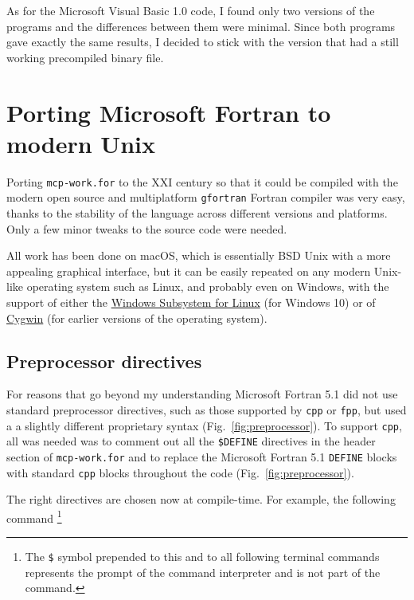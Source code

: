 As for the Microsoft Visual Basic 1.0 code, I found only two versions of the programs and the differences between them were minimal. Since both programs gave exactly the same results, I decided to stick with the version that had a still working precompiled binary file.



\section{Porting Microsoft Fortran to modern Unix}

Porting \texttt{mcp-work.for} to the XXI century so that it could be compiled with the modern open source and multiplatform \texttt{gfortran} Fortran compiler was very easy, thanks to the stability of the language across different versions and platforms. Only a few minor tweaks to the source code were needed.

All work has been done on macOS, which is essentially BSD Unix with a more appealing graphical interface, but it can be easily repeated on any modern Unix-like operating system such as Linux, and probably even on Windows, with the support of either the \href{https://docs.microsoft.com/en-us/windows/wsl/}{Windows Subsystem for Linux} (for Windows 10) or of \href{http://www.cygwin.org/}{Cygwin} (for earlier versions of the operating system).



\subsection{Preprocessor directives}

For reasons that go beyond my understanding Microsoft Fortran 5.1 did not use standard preprocessor directives, such as those supported by \texttt{cpp} or \texttt{fpp}, \cite{Boyanski:1992} but used a a slightly different proprietary syntax (Fig.~\ref{fig:preprocessor}). 
To support \texttt{cpp}, all was needed was to comment out all the \texttt{\$DEFINE} directives in the header section of \texttt{mcp-work.for} and to replace the Microsoft Fortran 5.1 \texttt{DEFINE} blocks with standard \texttt{cpp} blocks throughout the code (Fig.~\ref{fig:preprocessor}). 

The right directives are chosen now at compile-time. For example, the following command
\footnote{The \texttt{\$} symbol prepended to this and to all following terminal commands represents the prompt of the command interpreter and is not part of the command.}


